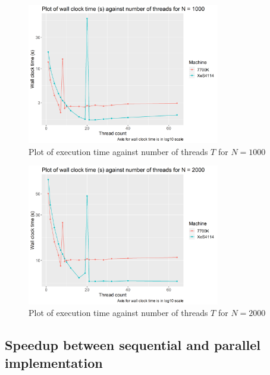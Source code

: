 \documentclass[12pt]{article}
\begin{document}
\begin{figure}[H]
    \centering
    \includegraphics[width=0.75\textwidth]{par-1000N-varyThreads}
    \caption{Plot of execution time against number of threads $T$ for $N = 1000$}
    \label{fig:par-1000N-varyThreads}
\end{figure}

\begin{figure}[H]
    \centering
    \includegraphics[width=0.75\textwidth]{par-2000N-varyThreads}
    \caption{Plot of execution time against number of threads $T$ for $N = 2000$}
    \label{fig:par-2000N-varyThreads}
\end{figure}

\subsection{Speedup between sequential and parallel implementation}
\end{document}
